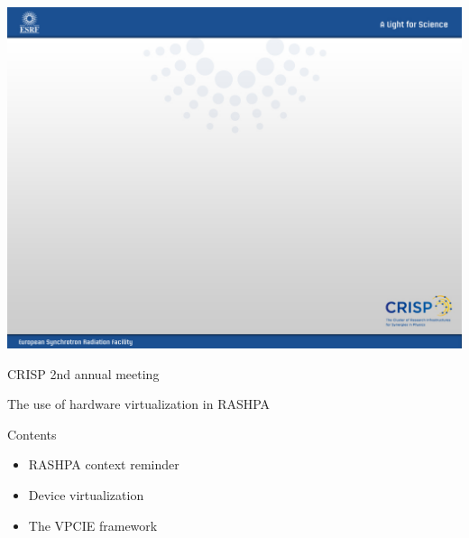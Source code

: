 \documentclass{beamer}
\begin{document}
\usebackgroundtemplate
{
\includegraphics[height=\paperheight,width=\paperwidth]{pic/esrf_crisp/esrf_crisp_default.jpeg}
}

\begin{frame}{CRISP 2nd annual meeting}
\begin{center}
The use of hardware virtualization in RASHPA
\end{center}
\end{frame}

\begin{frame}{Contents}
  \begin{itemize}
  \item RASHPA context reminder
  \item Device virtualization
  \item The VPCIE framework
  \end{itemize}
\end{frame}
\end{document}
